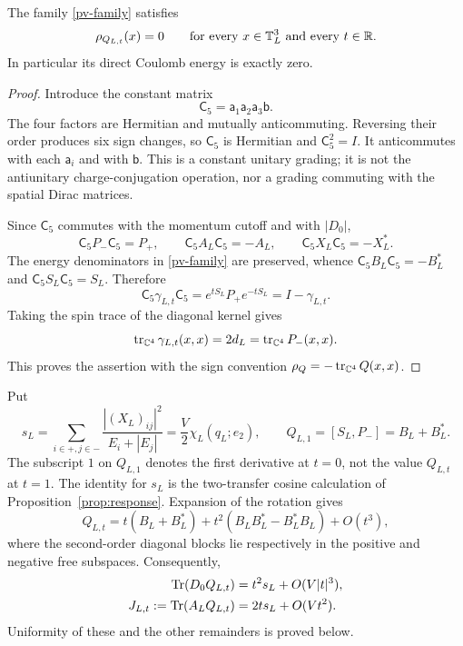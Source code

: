 \begin{lemma}
\label{pv-zero-charge}
The family \eqref{pv-family} satisfies
\[
 \rho_{Q_{L,t}}(x)=0
 \qquad\text{for every }x\in\mathbb T_L^3\text{ and every }t\in\mathbb R.
\]
In particular its direct Coulomb energy is exactly zero.
\end{lemma}
\begin{proof}
Introduce the constant matrix
\[
 \mathsf C_5=\mathsf a_1\mathsf a_2\mathsf a_3\mathsf b.
\]
The four factors are Hermitian and mutually anticommuting. Reversing
their order produces six sign changes, so \(\mathsf C_5\) is Hermitian
and \(\mathsf C_5^2=I\). It anticommutes with each \(\mathsf a_i\) and
with \(\mathsf b\). This is a constant unitary grading; it is not the
antiunitary charge-conjugation operation, nor a grading commuting with
the spatial Dirac matrices.

Since \(\mathsf C_5\) commutes with the momentum cutoff and with
\(|D_0|\),
\[
 \mathsf C_5P_-\mathsf C_5=P_+,
 \qquad \mathsf C_5A_L\mathsf C_5=-A_L,
 \qquad \mathsf C_5X_L\mathsf C_5=-X_L^*.
\]
The energy denominators in \eqref{pv-family} are preserved, whence
\(\mathsf C_5B_L\mathsf C_5=-B_L^*\) and
\(\mathsf C_5S_L\mathsf C_5=S_L\). Therefore
\[
 \mathsf C_5\gamma_{L,t}\mathsf C_5
 =e^{tS_L}P_+e^{-tS_L}=I-\gamma_{L,t}.
\]
Taking the spin trace of the diagonal kernel gives
\[
 \operatorname{tr}_{\mathbb C^4}\gamma_{L,t}(x,x)=2d_L
 =\operatorname{tr}_{\mathbb C^4}P_-(x,x).
\]
This proves the assertion with the sign convention
\(\rho_Q=-\operatorname{tr}_{\mathbb C^4}Q(x,x)\).
\end{proof}

Put
\begin{equation}
 s_L=\sum_{i\in+,j\in-}
          \frac{|(X_L)_{ij}|^2}{E_i+|E_j|}
     =\frac V2\chi_L(q_L;e_2),
 \qquad Q_{L,1}=[S_L,P_-]=B_L+B_L^*.
 \label{pv-susceptibility}
\end{equation}
The subscript \(1\) on \(Q_{L,1}\) denotes the first derivative at
\(t=0\), not the value \(Q_{L,t}\) at \(t=1\). The identity for \(s_L\)
is the two-transfer cosine calculation of Proposition~\ref{prop:response}.
Expansion of the rotation gives
\begin{equation}
 Q_{L,t}=t(B_L+B_L^*)+t^2(B_LB_L^*-B_L^*B_L)+O(t^3),
 \label{pv-expansion}
\end{equation}
where the second-order diagonal blocks lie respectively in the positive
and negative free subspaces. Consequently,
\begin{align}
 \operatorname{Tr}(D_0Q_{L,t})&=t^2s_L+O(V|t|^3),
 \label{pv-kinetic-expansion}\\
 J_{L,t}:=\operatorname{Tr}(A_LQ_{L,t})&=2ts_L+O(Vt^2).
 \label{pv-current-expansion}
\end{align}
Uniformity of these and the other remainders is proved below.

